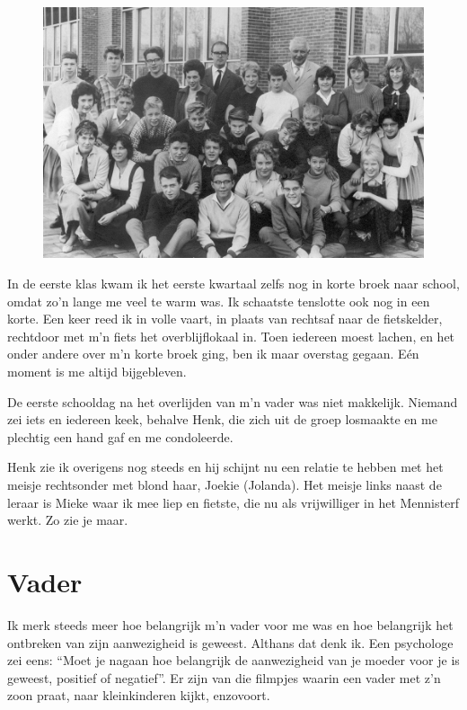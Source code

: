 \documentclass[12pt,twoside]{memoir}
\begin{document}
\begin{figure}
\includegraphics[width=\textwidth]{img/ch19/ULOSchool}
\end{figure}

In de eerste klas kwam ik het eerste kwartaal zelfs nog in korte broek naar school, omdat zo’n lange me veel te warm was. Ik schaatste tenslotte ook nog in een korte. Een keer reed ik in volle vaart, in plaats van rechtsaf naar de fietskelder, rechtdoor met m’n fiets het overblijflokaal in. Toen iedereen moest lachen, en het onder andere over m’n korte broek ging, ben ik maar overstag gegaan. Eén moment is me altijd bijgebleven. 

De eerste schooldag na het overlijden van m’n vader was niet makkelijk. Niemand zei iets en iedereen keek, behalve Henk, die zich uit de groep losmaakte en me plechtig een hand gaf en me condoleerde. 

Henk zie ik overigens nog steeds en hij schijnt nu een relatie te hebben met het meisje rechtsonder met blond haar, Joekie (Jolanda). Het meisje links naast de leraar is Mieke waar ik mee liep en fietste, die nu als vrijwilliger in het Mennisterf werkt. Zo zie je maar.

\chapter{Vader} %
\label{cha:vader}

Ik merk steeds meer hoe belangrijk m'n vader voor me was en hoe belangrijk het ontbreken van zijn aanwezigheid is geweest. Althans dat denk ik. Een psychologe zei eens: ``Moet je nagaan hoe belangrijk de aanwezigheid van je moeder voor je is geweest, positief of negatief''. Er zijn van die filmpjes waarin een vader met z'n zoon praat, naar kleinkinderen kijkt, enzovoort.
\end{document}
